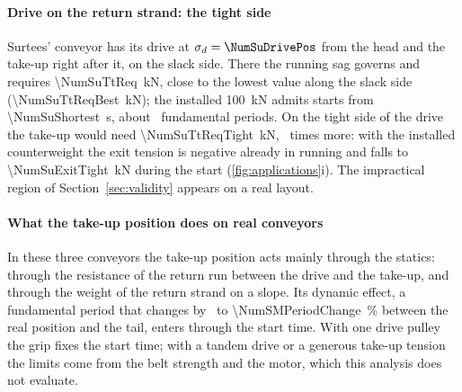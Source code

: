\paragraph{Drive on the return strand: the tight side} Surtees' conveyor has its drive at
$\sigma_d=\NumSuDrivePos$ from the head and the take-up right after it, on the slack side. There the
running sag governs and requires \qty{\NumSuTtReq}{\kilo\newton}, close to the lowest value
along the slack side (\qty{\NumSuTtReqBest}{\kilo\newton}); the installed
\qty{100}{\kilo\newton} admits starts from \qty{\NumSuShortest}{\second}, about
\NumSuShortestOverPeriod\ fundamental periods. On the tight side of the drive the take-up
would need \qty{\NumSuTtReqTight}{\kilo\newton}, \NumSuTightFactor\ times more: with the
installed counterweight the exit tension is negative already in running and falls to
\qty{\NumSuExitTight}{\kilo\newton} during the start (\cref{fig:applications}i). The
impractical region of Section~\ref{sec:validity} appears on a real layout.

\paragraph{What the take-up position does on real conveyors} In these three conveyors the
take-up position acts mainly through the statics: through the resistance of the return run
between the drive and the take-up, and through the weight of the return strand on a slope.
Its dynamic effect, a fundamental period that changes by \NumLoPeriodChange\ to
\qty{\NumSMPeriodChange}{\percent} between the real position and the tail, enters through the
start time. With one drive pulley the grip fixes the start time; with a tandem drive or a
generous take-up tension the limits come from the belt strength and the motor, which this
analysis does not evaluate.
